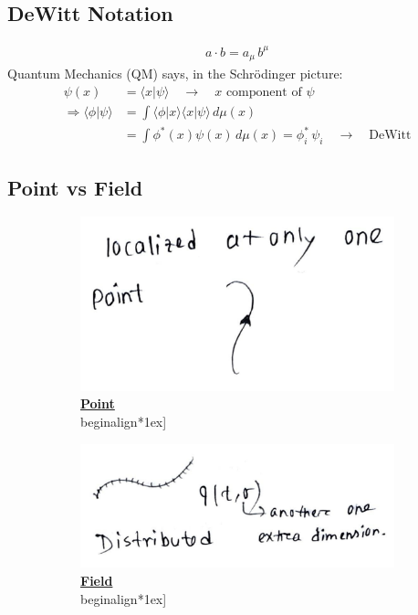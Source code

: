\documentclass[14pt]{article} %
\begin{document}
\subsection{DeWitt Notation}
\begin{align*} a \cdot b = a_\mu\, b^\mu \end{align*}
Quantum Mechanics (QM) says, in the Schrödinger picture:
\begin{align*}
\psi(x) &= \langle x | \psi \rangle \quad \to \quad x\text{ component of } \psi \\
\Rightarrow \langle \phi | \psi \rangle &= \int \langle \phi | x \rangle \langle x | \psi \rangle \, d\mu(x) \\
&= \int \phi^*(x) \psi(x) \, d\mu(x) = \phi_i^* \,\psi_i \quad \to \quad \text{DeWitt}
\end{align*}
\subsection{Point vs Field}
\begin{figure}[H]
    \centering
    
    \begin{subfigure}[t]{0.3\textwidth}
        \centering
        \includegraphics[width=\textwidth]{figures/L5_1.jpeg}
        \caption*{\underline{\textbf{Point}}\\begin{align*}1ex]}
    \end{subfigure}
    \hfill
    \begin{subfigure}[t]{0.4\textwidth}
        \centering
        \includegraphics[width=\textwidth]{figures/L5_2.jpeg}
        \caption*{\underline{\textbf{Field}}\\begin{align*}1ex]}
    \end{subfigure}    
    \caption*{}
\end{figure}
\end{document}
